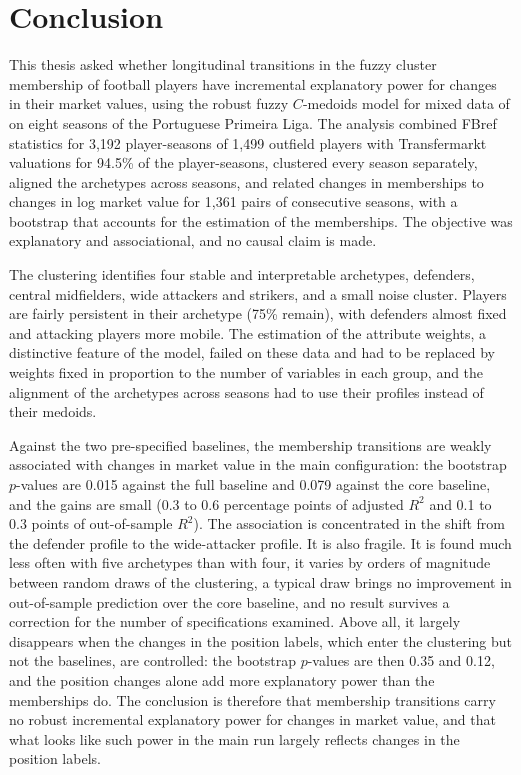 \chapter{Conclusion}
\label{ch:conclusion}

This thesis asked whether longitudinal transitions in the fuzzy cluster membership of football players have incremental explanatory power for changes in their market values, using the robust fuzzy $C$-medoids model for mixed data of  on eight seasons of the Portuguese Primeira Liga. The analysis combined FBref statistics for 3,192 player-seasons of 1,499 outfield players with Transfermarkt valuations for 94.5\% of the player-seasons, clustered every season separately, aligned the archetypes across seasons, and related changes in memberships to changes in log market value for 1,361 pairs of consecutive seasons, with a bootstrap that accounts for the estimation of the memberships. The objective was explanatory and associational, and no causal claim is made.

The clustering identifies four stable and interpretable archetypes, defenders, central midfielders, wide attackers and strikers, and a small noise cluster. Players are fairly persistent in their archetype (75\% remain), with defenders almost fixed and attacking players more mobile. The estimation of the attribute weights, a distinctive feature of the model, failed on these data and had to be replaced by weights fixed in proportion to the number of variables in each group, and the alignment of the archetypes across seasons had to use their profiles instead of their medoids.

Against the two pre-specified baselines, the membership transitions are weakly associated with changes in market value in the main configuration: the bootstrap $p$-values are 0.015 against the full baseline and 0.079 against the core baseline, and the gains are small (0.3 to 0.6 percentage points of adjusted $R^2$ and 0.1 to 0.3 points of out-of-sample $R^2$). The association is concentrated in the shift from the defender profile to the wide-attacker profile. It is also fragile. It is found much less often with five archetypes than with four, it varies by orders of magnitude between random draws of the clustering, a typical draw brings no improvement in out-of-sample prediction over the core baseline, and no result survives a correction for the number of specifications examined. Above all, it largely disappears when the changes in the position labels, which enter the clustering but not the baselines, are controlled: the bootstrap $p$-values are then 0.35 and 0.12, and the position changes alone add more explanatory power than the memberships do. The conclusion is therefore that membership transitions carry no robust incremental explanatory power for changes in market value, and that what looks like such power in the main run largely reflects changes in the position labels.

